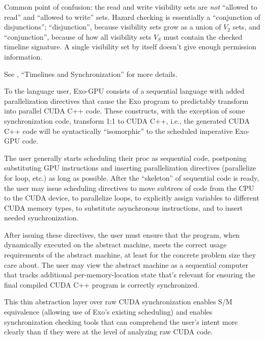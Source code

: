 \filbreak
Common point of confusion: the read and write visibility sets are \textit{not} ``allowed to read'' and ``allowed to write'' sets.
Hazard checking is essentially a ``conjunction of disjunctions''; ``disjunction'', because visibility sets grow as a union of $V_2$ sets, and ``conjunction'', because of how all visibility sets $V_S$ must contain the checked timeline signature.
A single visibility set by itself doesn't give enough permission information.

\filbreak
See , ``Timelines and Synchronization'' for more details.

\filbreak
{}


To the language user, Exo-GPU consists of a sequential language with added parallelization directives that cause the Exo program to predictably transform into parallel CUDA C++ code.
These constructs, with the exception of some synchronization code, transform 1:1 to CUDA C++, i.e., the generated CUDA C++ code will be syntactically ``isomorphic'' to the scheduled imperative Exo-GPU code.

\filbreak
The user generally starts scheduling their proc as sequential code, postponing substituting GPU instructions and inserting parallelization directives (parallelize for loop, etc.) as long as possible.
After the ``skeleton'' of sequential code is ready, the user may issue scheduling directives to move subtrees of code from the CPU to the CUDA device, to parallelize loops, to explicitly assign variables to different CUDA memory types, to substitute asynchronous instructions, and to insert needed synchronization.

\filbreak
After issuing these directives, the user must ensure that the program, when dynamically executed on the abstract machine, meets the correct usage requirements of the abstract machine, at least for the concrete problem size they care about.
The user may view the abstract machine as a sequential computer that tracks additional per-memory-location state that's relevant for ensuring the final compiled CUDA C++ program is correctly synchronized.

\filbreak
This thin abstraction layer over raw CUDA synchronization enables S/M equivalence (allowing use of Exo's existing scheduling) and enables synchronization checking tools that can comprehend the user's intent more clearly than if they were at the level of analyzing raw CUDA code.

